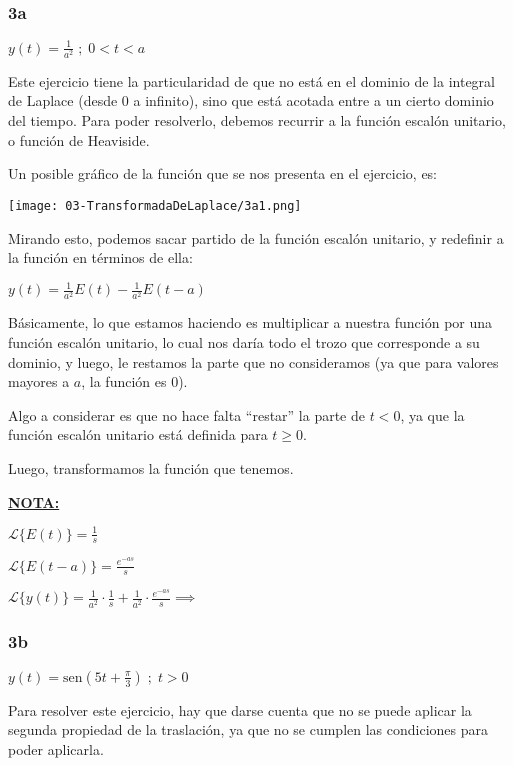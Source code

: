 \documentclass[11pt]{article}
\def\sen{\mathrm{sen}}
\newcommand{\lapl}[1]{\mathscr{L} \lbrace {#1} \rbrace}
\begin{document}
    \subsubsection{3a}
    $\displaystyle y(t)=\frac{1}{a^{2}} \;;\;0<t<a$
    
    Este ejercicio tiene la particularidad de que no está en el dominio de la integral de Laplace (desde 0 a infinito), sino que está acotada entre a un cierto dominio del tiempo. Para poder resolverlo, debemos recurrir a la función escalón unitario, o función de Heaviside.
    
    Un posible gráfico de la función que se nos presenta en el ejercicio, es:
    
    \texttt{[image: 03-TransformadaDeLaplace/3a1.png]}
    
    Mirando esto, podemos sacar partido de la función escalón unitario, y redefinir a la función en términos de ella:
    
    $\displaystyle y(t)=\frac{1}{a^{2}}E(t)-\frac{1}{a^{2}}E(t-a)$
    
    Básicamente, lo que estamos haciendo es multiplicar a nuestra función por una función escalón unitario, lo cual nos daría todo el trozo que corresponde a su dominio, y luego, le restamos la parte que no consideramos (ya que para valores mayores a $a$, la función es 0).
    
    Algo a considerar es que no hace falta ``restar'' la parte de $t<0$, ya que la función escalón unitario está definida para $t \geq 0$.
    
    Luego, transformamos la función que tenemos. 
    
    \textbf{\underline{NOTA:}} 
    
    $\displaystyle \lapl{E(t)}=\frac{1}{s}$
    
    $\displaystyle \lapl{E(t-a)}=\frac{e^{-as}}{s}$
    
    $\displaystyle \lapl{y(t)}=\frac{1}{a^{2}} \cdot \frac{1}{s}+ \frac{1}{a^{2}} \cdot \frac{e^{-as}}{s} \implies$
    
    \subsubsection{3b}
    $y(t)=\sen \left(5t+\frac{\pi}{3} \right)\;;\;t>0$
    
    Para resolver este ejercicio, hay que darse cuenta que no se puede aplicar la segunda propiedad de la traslación, ya que no se cumplen las condiciones para poder aplicarla.
    
\end{document}
